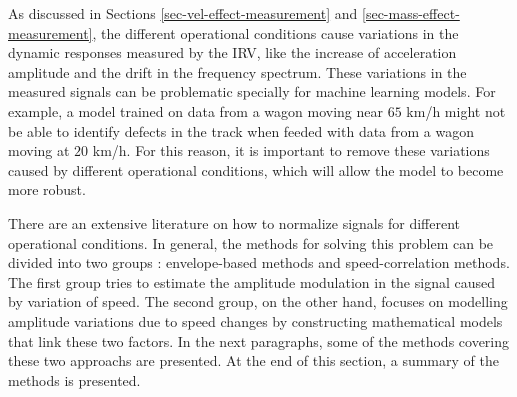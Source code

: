 As discussed in Sections \ref{sec-vel-effect-measurement} and \ref{sec-mass-effect-measurement}, the different operational conditions cause variations in the dynamic responses measured by the IRV, like the increase of acceleration amplitude and the drift in the frequency spectrum. These variations in the measured signals can be problematic specially for machine learning models. For example, a model trained on data from a wagon moving near $65$ km/h might not be able to identify defects in the track when feeded with data from a wagon moving at $20$ km/h. For this reason, it is important to remove these variations caused by different operational conditions, which will allow the model to become more robust.

There are an extensive literature on how to normalize signals for different operational conditions. In general, the methods for solving this problem can be divided into two groups \cite{RAO2024111751,FANG2025}: envelope-based methods and speed-correlation methods. The first group tries to estimate the amplitude modulation in the signal caused by variation of speed. The second group, on the other hand, focuses on modelling amplitude variations due to speed changes by constructing mathematical models that link these two factors. In the next paragraphs, some of the methods covering these two approachs are presented. At the end of this section, a summary of the methods is presented.

